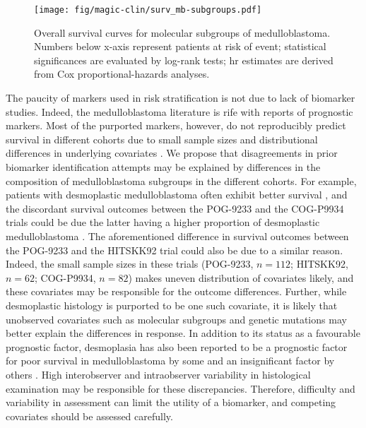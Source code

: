 \begin{SCfigure}[5][b]
	\texttt{[image: fig/magic-clin/surv\_mb-subgroups.pdf]}
	\caption[Overall survival curves for molecular subgroups of medulloblastoma]
	{
		Overall survival curves for molecular subgroups of medulloblastoma.
		Numbers below x-axis represent patients at risk of event; statistical significances are evaluated by log-rank tests; \gls{hr} estimates are derived from Cox proportional-hazards analyses.
	}
	\label{fig:surv_mb-subgroups}
\end{SCfigure}

The paucity of markers used in risk stratification is not due to lack of biomarker studies. Indeed, the medulloblastoma literature is rife with reports of prognostic markers. Most of the purported markers, however, do not reproducibly predict survival in different cohorts due to small sample sizes and distributional differences in underlying covariates . We propose that disagreements in prior biomarker identification attempts may be explained by differences in the composition of medulloblastoma subgroups in the different cohorts. For example, patients with desmoplastic medulloblastoma often exhibit better survival , and the discordant survival outcomes between the POG-9233 and the COG-P9934 trials could be due the latter having a higher proportion of desmoplastic medulloblastoma . The aforementioned difference in survival outcomes between the POG-9233 and the HITSKK92 trial could also be due to a similar reason. Indeed, the small sample sizes in these trials (POG-9233, $n = 112$; HITSKK92, $n = 62 $; COG-P9934, $n = 82$) makes uneven distribution of covariates likely, and these covariates may be responsible for the outcome differences. Further, while desmoplastic histology is purported to be one such covariate, it is likely that unobserved covariates such as molecular subgroups and genetic mutations may better explain the differences in response. In addition to its status as a favourable prognostic factor, desmoplasia has also been reported to be a prognostic factor for poor survival in medulloblastoma by some  and an insignificant factor by others . High interobserver and intraobserver variability in histological examination may be responsible for these discrepancies. Therefore, difficulty and variability in assessment can limit the utility of a biomarker, and competing covariates should be assessed carefully.

